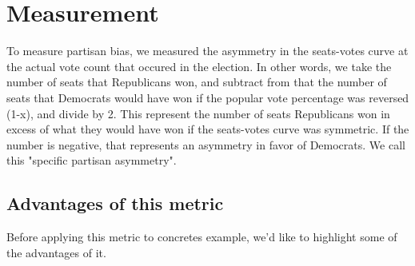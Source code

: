 \documentclass[preprint,12pt]{article}
\begin{document}
\section{Measurement}
To measure partisan bias, we measured the asymmetry in the seats-votes curve at the actual vote count that occured in the election.  
In other words, we take the number of seats that Republicans won, and subtract from that the number of seats that Democrats would have won if the popular vote percentage was reversed (1-x), and divide by 2.  
This represent the number of seats Republicans won in excess of what they would have won if the seats-votes curve was symmetric.  
If the number is negative, that represents an asymmetry in favor of Democrats.
We call this "specific partisan asymmetry".

\subsection{Advantages of this metric}
 
Before applying this metric to concretes example, we'd like to highlight some of the advantages of it.
\end{document}
